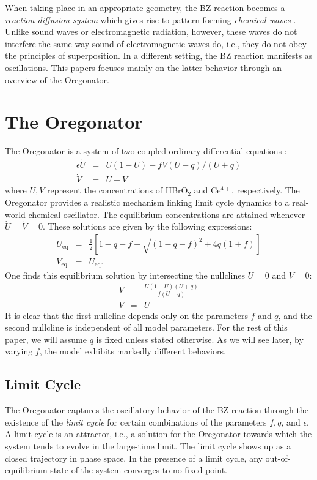 \documentclass[twocolumn,amsmath,amssymb,aps]{revtex4}
\begin{document}
When taking place in an appropriate geometry, the BZ reaction becomes a \textit{reaction-diffusion system} which gives rise to pattern-forming \textit{chemical waves} \cite{ball1999self}. Unlike sound waves or electromagnetic radiation, however, these waves do not interfere the same way sound of electromagnetic waves do, i.e., they do not obey the principles of superposition. In a different setting, the BZ reaction manifests as oscillations. This papers focuses mainly on the latter behavior through an overview of the Oregonator.

\section{The Oregonator}
The Oregonator is a system of two coupled ordinary differential equations \cite{doi:10.1063/1.1681288}:
\begin{eqnarray}
\epsilon \dot{U} &=& U(1-U) - fV(U-q)/(U+q) \\
\dot{V} &=&  U-V
\end{eqnarray}
where $U,V$ represent the concentrations of HBrO$_2$ and Ce$^{4+}$, respectively. The Oregonator provides a realistic mechanism linking limit cycle dynamics to a real-world chemical oscillator. The equilibrium concentrations are attained whenever $\dot{U} = \dot{V} = 0$. These solutions are given by the following expressions:
\begin{eqnarray}
U_{\text{eq}} &=& \frac{1}{2}\left[1-q-f + \sqrt{(1-q-f)^2 + 4q(1+f)}\right]\nonumber \\ 
V_{\text{eq}} &=& U_{\text{eq}}. 
\end{eqnarray}
One finds this equilibrium solution by intersecting the nullclines $\dot{U} = 0$ and $\dot{V} = 0$:
\begin{eqnarray} 
V &=& \frac{U(1-U)(U+q)}{f(U-q)}\\
V &=&U 
\end{eqnarray}
It is clear that the first nullcline depends only on the parameters $f$ and $q$, and the second nullcline is independent of all model parameters. For the rest of this paper, we will assume $q$ is fixed unless stated otherwise. As we will see later, by varying $f$, the model exhibits markedly different behaviors. 

\subsection{Limit Cycle}
The Oregonator captures the oscillatory behavior of the BZ reaction through the existence of the \textit{limit cycle} for certain combinations of the parameters $f,q$, and $\epsilon$. A limit cycle is an attractor, i.e., a solution for the Oregonator towards which the system tends to evolve in the large-time limit. The limit cycle shows up as a closed trajectory in phase space. In the presence of a limit cycle, any out-of-equilibrium state of the system converges to no fixed point. 
\end{document}
